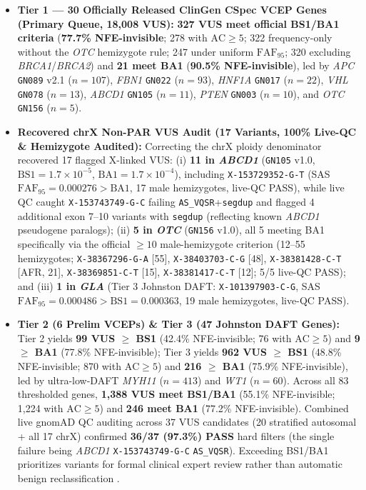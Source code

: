 \documentclass[11pt,letterpaper]{article}
\begin{document}
\begin{itemize}
  \item \textbf{Tier 1 --- 30 Officially Released ClinGen CSpec VCEP Genes (Primary Queue, 18,008 VUS):} \textbf{327 VUS meet official BS1/BA1 criteria} (\textbf{77.7\% NFE-invisible}; 278 with $\mathrm{AC}\ge 5$; 322 frequency-only without the \textit{OTC} hemizygote rule; 247 under uniform $\mathrm{FAF}_{95}$; 320 excluding \textit{BRCA1}/\textit{BRCA2}) and \textbf{21 meet BA1} (\textbf{90.5\% NFE-invisible}), led by \textit{APC} \texttt{GN089} v2.1 ($n=107$), \textit{FBN1} \texttt{GN022} ($n=93$), \textit{HNF1A} \texttt{GN017} ($n=22$), \textit{VHL} \texttt{GN078} ($n=13$), \textit{ABCD1} \texttt{GN105} ($n=11$), \textit{PTEN} \texttt{GN003} ($n=10$), and \textit{OTC} \texttt{GN156} ($n=5$).
  \item \textbf{Recovered chrX Non-PAR VUS Audit (17 Variants, 100\% Live-QC \& Hemizygote Audited):} Correcting the chrX ploidy denominator recovered 17 flagged X-linked VUS: (i) \textbf{11 in \textit{ABCD1}} (\texttt{GN105} v1.0, $\mathrm{BS1}=1.7\times 10^{-5}$, $\mathrm{BA1}=1.7\times 10^{-4}$), including \texttt{X-153729352-G-T} (SAS $\mathrm{FAF}_{95}=0.000276 > \mathrm{BA1}$, 17 male hemizygotes, live-QC PASS), while live QC caught \texttt{X-153743749-G-C} failing \texttt{AS\_VQSR}+\texttt{segdup} and flagged 4 additional exon 7--10 variants with \texttt{segdup} (reflecting known \textit{ABCD1} pseudogene paralogs); (ii) \textbf{5 in \textit{OTC}} (\texttt{GN156} v1.0), all 5 meeting BA1 specifically via the official $\ge 10$ male-hemizygote criterion (12--55 hemizygotes; \texttt{X-38367296-G-A} [55], \texttt{X-38403703-C-G} [48], \texttt{X-38381428-C-T} [AFR, 21], \texttt{X-38369851-C-T} [15], \texttt{X-38381417-C-T} [12]; 5/5 live-QC PASS); and (iii) \textbf{1 in \textit{GLA}} (Tier 3 Johnston DAFT: \texttt{X-101397903-C-G}, SAS $\mathrm{FAF}_{95}=0.000486 > \mathrm{BS1}=0.000363$, 19 male hemizygotes, live-QC PASS).
  \item \textbf{Tier 2 (6 Prelim VCEPs) \& Tier 3 (47 Johnston DAFT Genes):} Tier 2 yields \textbf{99 VUS $\ge$ BS1} (42.4\% NFE-invisible; 76 with $\mathrm{AC}\ge 5$) and \textbf{9 $\ge$ BA1} (77.8\% NFE-invisible); Tier 3 yields \textbf{962 VUS $\ge$ BS1} (48.8\% NFE-invisible; 870 with $\mathrm{AC}\ge 5$) and \textbf{216 $\ge$ BA1} (75.9\% NFE-invisible), led by ultra-low-DAFT \textit{MYH11} ($n=413$) and \textit{WT1} ($n=60$). Across all 83 thresholded genes, \textbf{1,388 VUS meet BS1/BA1} (55.1\% NFE-invisible; 1,224 with $\mathrm{AC}\ge 5$) and \textbf{246 meet BA1} (77.2\% NFE-invisible). Combined live gnomAD QC auditing across 37 VUS candidates (20 stratified autosomal + all 17 chrX) confirmed \textbf{36/37 (97.3\%) PASS} hard filters (the single failure being \textit{ABCD1} \texttt{X-153743749-G-C} \texttt{AS\_VQSR}). Exceeding BS1/BA1 prioritizes variants for formal clinical expert review rather than automatic benign reclassification \citep{richards2015standards,ghosh2018ba1,johnston2026daft}.
\end{itemize}
\end{document}

